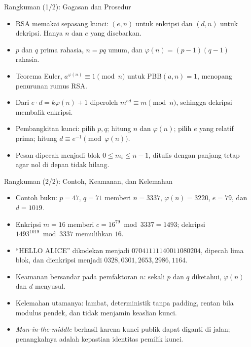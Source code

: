 \documentclass[aspectratio=169,11pt]{beamer}
\begin{document}
\begin{frame}{Rangkuman (1/2): Gagasan dan Prosedur}
    \footnotesize
    \begin{itemize}
        \item RSA memakai sepasang kunci: $(e,n)$ untuk enkripsi dan
              $(d,n)$ untuk dekripsi. Hanya $n$ dan $e$ yang disebarkan.
        \item $p$ dan $q$ prima rahasia, $n = pq$ umum, dan
              $\varphi(n) = (p-1)(q-1)$ rahasia.
        \item Teorema Euler, $a^{\varphi(n)} \equiv 1 \pmod n$ untuk
              $\text{PBB}(a,n)=1$, menopang penurunan rumus RSA.
        \item Dari $e \cdot d = k\varphi(n)+1$ diperoleh
              $m^{ed} \equiv m \pmod n$, sehingga dekripsi membalik
              enkripsi.
        \item Pembangkitan kunci: pilih $p,q$; hitung $n$ dan
              $\varphi(n)$; pilih $e$ yang relatif prima; hitung
              $d \equiv e^{-1} \pmod{\varphi(n)}$.
        \item Pesan dipecah menjadi blok $0 \le m_i \le n-1$, ditulis
              dengan panjang tetap agar nol di depan tidak hilang.
    \end{itemize}
\end{frame}

\begin{frame}{Rangkuman (2/2): Contoh, Keamanan, dan Kelemahan}
    \footnotesize
    \begin{itemize}
        \item Contoh buku: $p=47$, $q=71$ memberi $n=3337$,
              $\varphi(n)=3220$, $e=79$, dan $d=1019$.
        \item Enkripsi $m=16$ memberi $c = 16^{79} \bmod 3337 = 1493$;
              dekripsi $1493^{1019} \bmod 3337$ memulihkan $16$.
        \item ``HELLO ALICE'' dikodekan menjadi
              $07041111140011080204$, dipecah lima blok, dan dienkripsi
              menjadi $0328, 0301, 2653, 2986, 1164$.
        \item Keamanan bersandar pada pemfaktoran $n$: sekali $p$ dan $q$
              diketahui, $\varphi(n)$ dan $d$ menyusul.
        \item Kelemahan utamanya: lambat, deterministik tanpa padding,
              rentan bila modulus pendek, dan tidak menjamin keaslian kunci.
        \item \textit{Man-in-the-middle} berhasil karena kunci publik dapat
              diganti di jalan; penangkalnya adalah kepastian identitas
              pemilik kunci.
    \end{itemize}
\end{frame}
\end{document}
